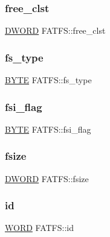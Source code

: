 \subsubsection{\texorpdfstring{free\+\_\+clst}{free\_clst}}
{\footnotesize\ttfamily \mbox{\hyperlink{integer_8h_ad342ac907eb044443153a22f964bf0af}{D\+W\+O\+RD}} F\+A\+T\+F\+S\+::free\+\_\+clst}

\mbox{\label{struct_f_a_t_f_s_add27d97babe807b573eac98a71dc4ae5}} 
\subsubsection{\texorpdfstring{fs\+\_\+type}{fs\_type}}
{\footnotesize\ttfamily \mbox{\hyperlink{lz4_8c_a4ae1dab0fb4b072a66584546209e7d58}{B\+Y\+TE}} F\+A\+T\+F\+S\+::fs\+\_\+type}

\mbox{\label{struct_f_a_t_f_s_a84e9cdc5a6a8e33ea7ec192058abf161}} 
\subsubsection{\texorpdfstring{fsi\+\_\+flag}{fsi\_flag}}
{\footnotesize\ttfamily \mbox{\hyperlink{lz4_8c_a4ae1dab0fb4b072a66584546209e7d58}{B\+Y\+TE}} F\+A\+T\+F\+S\+::fsi\+\_\+flag}

\mbox{\label{struct_f_a_t_f_s_a53e9560659f14e66f306c2c444198bf3}} 
\subsubsection{\texorpdfstring{fsize}{fsize}}
{\footnotesize\ttfamily \mbox{\hyperlink{integer_8h_ad342ac907eb044443153a22f964bf0af}{D\+W\+O\+RD}} F\+A\+T\+F\+S\+::fsize}

\mbox{\label{struct_f_a_t_f_s_a417095d7c20d56d417dc0998e0dd5a5c}} 
\subsubsection{\texorpdfstring{id}{id}}
{\footnotesize\ttfamily \mbox{\hyperlink{integer_8h_a197942eefa7db30960ae396d68339b97}{W\+O\+RD}} F\+A\+T\+F\+S\+::id}


